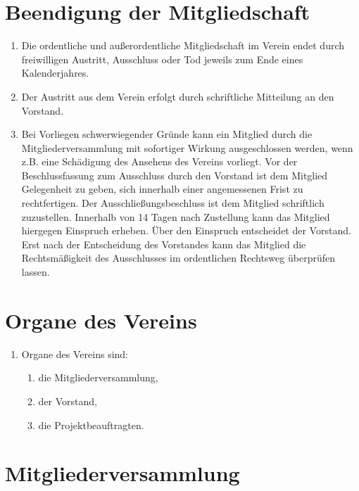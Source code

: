 \documentclass[
  fontsize=12pt,
  paper=a4,
  DIV14,
  parskip,
]{scrartcl}
\begin{document}
\section{Beendigung der Mitgliedschaft}

\begin{enumerate}
	\item Die ordentliche und außerordentliche Mitgliedschaft im Verein endet
		durch freiwilligen Austritt, Ausschluss oder Tod jeweils zum Ende eines
		Kalenderjahres.
	\item Der Austritt aus dem Verein erfolgt durch schriftliche Mitteilung an
		den Vorstand.
	\item Bei Vorliegen schwerwiegender Gründe kann ein Mitglied durch die
		Mitgliederversammlung mit sofortiger Wirkung ausgeschlossen werden,
		wenn z.B. eine Schädigung des Ansehens des Vereins vorliegt.
		Vor der Beschlussfassung zum Ausschluss durch den Vorstand ist dem
		Mitglied Gelegenheit zu geben, sich innerhalb einer angemessenen Frist
		zu rechtfertigen. Der Ausschließungsbeschluss ist dem Mitglied schriftlich
		zuzustellen. Innerhalb von 14 Tagen nach Zustellung kann das Mitglied
		hiergegen Einspruch erheben.
		Über den Einspruch entscheidet der Vorstand. Erst nach der Entscheidung
		des Vorstandes kann das Mitglied die Rechtsmäßigkeit des Ausschlusses im
		ordentlichen Rechtsweg überprüfen lassen.
\end{enumerate}

\section{Organe des Vereins}

\begin{enumerate}
	\item Organe des Vereins sind:
    \begin{enumerate}
      \item die Mitgliederversammlung,
      \item der Vorstand,
      \item die Projektbeauftragten.
    \end{enumerate}
\end{enumerate}

\section{Mitgliederversammlung}
\end{document}
